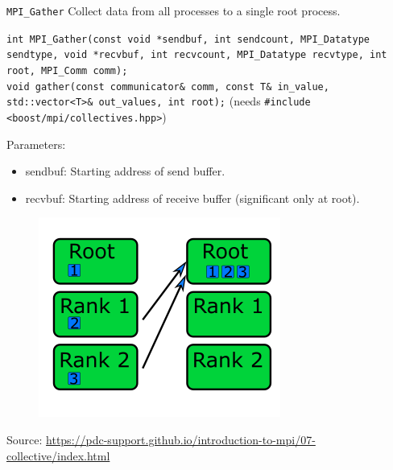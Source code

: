 \documentclass{beamer}
\begin{document}
\begin{frame}{\texttt{MPI\_Gather}}
  Collect data from all processes to a single root process.

  {
    \footnotesize
    \texttt{int MPI\_Gather(const void *sendbuf, int sendcount, MPI\_Datatype sendtype, void *recvbuf, int recvcount, MPI\_Datatype recvtype, int root, MPI\_Comm comm);} \\
    \texttt{void gather(const communicator\& comm, const T\& in\_value, std::vector<T>\& out\_values, int root);} (needs \texttt{\#include <boost/mpi/collectives.hpp>})
  }

  \begin{minipage}[t]{0.6\textwidth}
    Parameters:
    \begin{itemize}
      \item sendbuf: Starting address of send buffer.
      \item recvbuf: Starting address of receive buffer (significant only at root).
    \end{itemize}
  \end{minipage}
  \hfill
  \begin{minipage}[t]{0.35\textwidth}
    \begin{figure}[h]
      \includegraphics[]{images/gather.png}
    \end{figure}
  \end{minipage}
  {\footnotesize Source: \href{https://pdc-support.github.io/introduction-to-mpi/07-collective/index.html}{https://pdc-support.github.io/introduction-to-mpi/07-collective/index.html}}
\end{frame}
\end{document}
